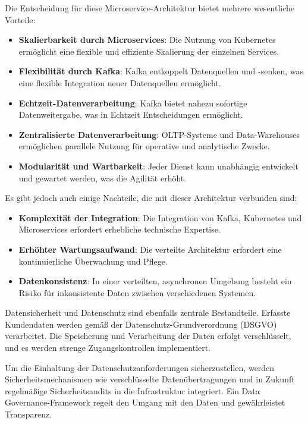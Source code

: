 \documentclass[%
pdftex,
oneside,			%
11pt,				%
parskip=half,		%
headheight = 12pt,	%
headsepline,		%
footsepline,		%
footheight = 16pt,	%
abstracton,		%
DIV=calc,		%
BCOR=8mm,		%
headinclude=false,	%
footinclude=false,	%
listof=totoc,		%
toc=bibliography,	%
]{scrreprt}	%
\begin{document}
    Die Entscheidung für diese Microservice-Architektur bietet mehrere wesentliche Vorteile:
    \begin{itemize}
        \item \textbf{Skalierbarkeit durch Microservices}: Die Nutzung von Kubernetes ermöglicht eine flexible und effiziente Skalierung der einzelnen Services.
        \item \textbf{Flexibilität durch Kafka}: Kafka entkoppelt Datenquellen und -senken, was eine flexible Integration neuer Datenquellen ermöglicht.
        \item \textbf{Echtzeit-Datenverarbeitung}: Kafka bietet nahezu sofortige Datenweitergabe, was in Echtzeit Entscheidungen ermöglicht.
        \item \textbf{Zentralisierte Datenverarbeitung}: OLTP-Systeme und Data-Warehouses ermöglichen parallele Nutzung für operative und analytische Zwecke.
        \item \textbf{Modularität und Wartbarkeit}: Jeder Dienst kann unabhängig entwickelt und gewartet werden, was die Agilität erhöht.
    \end{itemize}

    Es gibt jedoch auch einige Nachteile, die mit dieser Architektur verbunden sind:
    \begin{itemize}
        \item \textbf{Komplexität der Integration}: Die Integration von Kafka, Kubernetes und Microservices erfordert erhebliche technische Expertise.
        \item \textbf{Erhöhter Wartungsaufwand}: Die verteilte Architektur erfordert eine kontinuierliche Überwachung und Pflege.
        \item \textbf{Datenkonsistenz}: In einer verteilten, asynchronen Umgebung besteht ein Risiko für inkonsistente Daten zwischen verschiedenen Systemen.
    \end{itemize}


    Datensicherheit und Datenschutz sind ebenfalls zentrale Bestandteile.
    Erfasste Kundendaten werden gemäß der Datenschutz-Grundverordnung (DSGVO) verarbeitet.
    Die Speicherung und Verarbeitung der Daten erfolgt verschlüsselt, und es werden strenge Zugangskontrollen implementiert.

    Um die Einhaltung der Datenschutzanforderungen sicherzustellen, werden Sicherheitsmechanismen wie verschlüsselte Datenübertragungen und in Zukunft regelmäßige Sicherheitsaudits in die Infrastruktur integriert.
    Ein Data Governance-Framework regelt den Umgang mit den Daten und gewährleistet Transparenz.
\end{document}
